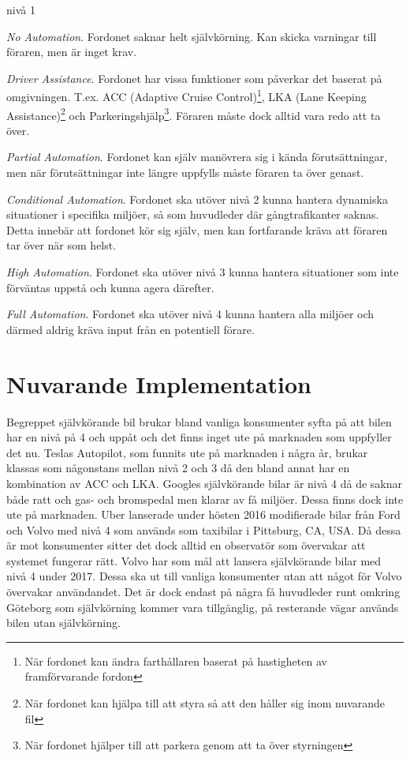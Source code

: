 \documentclass[a4paper]{IEEEtran}
\begin{document}
\vspace{10 pt}
\begin{labeling}{nivå 1}
	\item [\textbf{nivå 0}] \emph{No Automation}. Fordonet saknar helt självkörning. Kan skicka varningar till föraren, men är inget krav.
	\item [\textbf{nivå 1}] \emph{Driver Assistance}. Fordonet har vissa funktioner som påverkar det baserat på omgivningen. T.ex. ACC (Adaptive Cruise Control)\footnote{När fordonet kan ändra farthållaren baserat på hastigheten av framförvarande fordon\cite{ACC}}, LKA (Lane Keeping Assistance)\footnote{När fordonet kan hjälpa till att styra så att den håller sig inom nuvarande fil\cite{LKA}} och Parkeringshjälp\footnote{När fordonet hjälper till att parkera genom att ta över styrningen\cite{AP}}. Föraren måste dock alltid vara redo att ta över.
	\item [\textbf{nivå 2}] \emph{Partial Automation}. Fordonet kan själv manövrera sig i kända förutsättningar, men när förutsättningar inte längre uppfylls måste föraren ta över genast.
	\item [\textbf{nivå 3}] \emph{Conditional Automation}. Fordonet ska utöver nivå 2 kunna hantera dynamiska situationer i specifika miljöer, så som huvudleder där gångtrafikanter saknas. Detta innebär att fordonet kör sig själv, men kan fortfarande kräva att föraren tar över när som helst.
	\item [\textbf{nivå 4}] \emph{High Automation}. Fordonet ska utöver nivå 3 kunna hantera situationer som inte förväntas uppstå och kunna agera därefter.
	\item [\textbf{nivå 5}] \emph{Full Automation}. Fordonet ska utöver nivå 4 kunna hantera alla miljöer och därmed aldrig kräva input från en potentiell förare.
\end{labeling}

\section{Nuvarande Implementation}
Begreppet självkörande bil brukar bland vanliga konsumenter syfta på att bilen har en nivå på 4 och uppåt och det finns inget ute på marknaden som uppfyller det nu.
Teslas Autopilot, som funnits ute på marknaden i några år, brukar klassas som någonstans mellan nivå 2 och 3 då den bland annat har en kombination av ACC och LKA. 
Googles självkörande bilar är nivå 4 då de saknar både ratt och gas- och bromspedal men klarar av få miljöer.
Dessa finns dock inte ute på marknaden.
Uber lanserade under hösten 2016 modifierade bilar från Ford och Volvo med nivå 4 som används som taxibilar i Pittsburg, CA, USA. Då dessa är mot konsumenter sitter det dock alltid en observatör som övervakar att systemet fungerar rätt.
Volvo har som mål att lansera självkörande bilar med nivå 4 under 2017. Dessa ska ut till vanliga konsumenter utan att något för Volvo övervakar användandet. Det är dock endast på några få huvudleder runt omkring Göteborg som självkörning kommer vara tillgänglig, på resterande vägar används bilen utan självkörning.
\cite{UberAD,VergeAD,CWGoogleAD}
\end{document}
